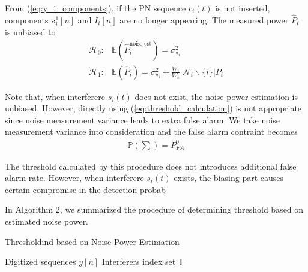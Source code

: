 \documentclass{IEEEtran}
\begin{document}
From (\ref{eq:y_i_components}), if the PN sequence $c_i(t)$ is not inserted, components $\mathtt{s}^1_i[n]$ and $I_i[n]$ are no longer appearing. The measured power $\hat{P}_i$ is unbiased to 
\begin{align}
\mathcal{H}_0:& \mathbb{E}(\hat{P}^{\text{noise est}}_i) = \sigma^2_{\mathtt{v}_i}\nonumber\\
\mathcal{H}_1:& \mathbb{E}(\hat{P}_i) = \sigma^2_{\mathtt{v}_i}+\frac{W_i}{W_c}\left|\mathcal{N}_i\backslash \{i\}\right|P_i
\end{align}

Note that, when interferere $s_i(t)$ does not exist, the noise power estimation is unbiased. However, directly using (\ref{eq:threshold_calculation}) is not appropriate since noise measurement variance leads to extra false alarm. We take noise measurement variance into consideration and the false alarm contraint becomes
\begin{align}
\mathbb{P}\left(\sum \right) = P_{FA}^{0}
\end{align}

The threshold calculated by this procedure does not introduces additional false alarm rate. However, when interferere $s_i(t)$ exists, the biasing part causes certain compromise in the detection probab

In Algorithm 2, we summarized the procedure of determining threshold based on estimated noise power.
 \begin{algorithm}
 \caption{Thresholdind based on Noise Power Estimation}
 \begin{algorithmic}[1]
 \renewcommand{\algorithmicrequire}{\textbf{Input:}}
 \renewcommand{\algorithmicensure}{\textbf{Output:}}
	\REQUIRE Digitized sequences $y[n]$
	\ENSURE  Interferers index set $\mathbb{T}$
	\ENDFOR
 \end{algorithmic}
 \end{algorithm}
%
%
\end{document}
